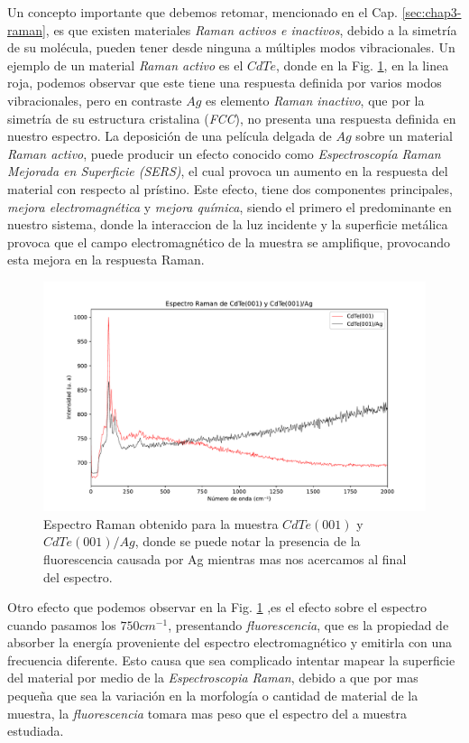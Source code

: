 Un concepto importante que debemos retomar, mencionado en el Cap. \ref{sec:chap3-raman}, es que existen materiales \textit{Raman activos e inactivos}, debido a la simetría de su molécula, pueden tener desde ninguna a múltiples modos vibracionales. Un ejemplo de un material \textit{Raman activo} es el $CdTe$, donde en la Fig. \ref{fig:raman-cdte-all}, en la linea roja, podemos observar que este tiene una respuesta definida por varios modos vibracionales, pero en contraste $Ag$ es elemento \textit{Raman inactivo}, que por la simetría de su estructura cristalina (\textit{FCC}), no presenta una respuesta definida en nuestro espectro. La deposición de una película delgada de $Ag$ sobre un material \textit{Raman activo}, puede producir un efecto conocido como \textit{Espectroscopía Raman Mejorada en Superficie (SERS)}, el cual provoca un aumento en la respuesta del material con respecto al prístino. Este efecto, tiene dos componentes principales, \textit{mejora electromagnética} y \textit{mejora química}, siendo el primero el predominante en nuestro sistema, donde la interaccion de la luz incidente y la superficie metálica provoca que el campo electromagnético de la muestra se amplifique, provocando esta mejora en la respuesta Raman.\cite{Sun2016}

\begin{figure}[H]
    \centering
    \includegraphics[width=1\textwidth]{figures/chap4/cdte-ag/raman-results/raman-CdTeAg-all.pdf}
    \caption{Espectro Raman obtenido para la muestra $CdTe(001)$ y $CdTe(001)/Ag$, donde se
        puede notar la presencia de la fluorescencia causada por Ag mientras mas nos 
        acercamos al final del espectro.}
    \label{fig:raman-cdte-all}
\end{figure}

Otro efecto que podemos observar en la Fig. \ref{fig:raman-cdte-all} ,es el efecto sobre el espectro cuando pasamos los $750 cm^{-1}$, presentando \textit{fluorescencia}, que es la propiedad de absorber la energía proveniente del espectro electromagnético y emitirla con una frecuencia diferente. Esto causa que sea complicado intentar mapear la superficie del material por medio de la \textit{Espectroscopia Raman}, debido a que por mas pequeña que sea la variación en la morfología o cantidad de material de la muestra, la \textit{fluorescencia} tomara mas peso que el espectro del a muestra estudiada.

